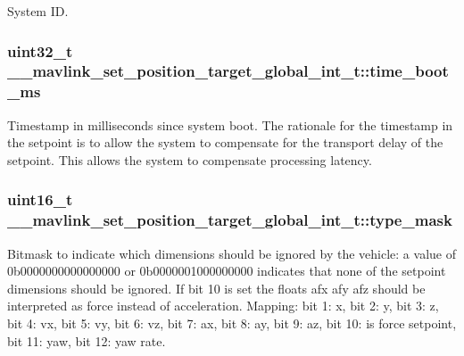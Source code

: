 System I\+D. 

\hypertarget{struct____mavlink__set__position__target__global__int__t_a06fb7be6c7bff5a263a0d795f5c8b8c1}{
\subsubsection[{time\+\_\+boot\+\_\+ms}]{\setlength{\rightskip}{0pt plus 5cm}uint32\+\_\+t \+\_\+\+\_\+mavlink\+\_\+set\+\_\+position\+\_\+target\+\_\+global\+\_\+int\+\_\+t\+::time\+\_\+boot\+\_\+ms}}\label{struct____mavlink__set__position__target__global__int__t_a06fb7be6c7bff5a263a0d795f5c8b8c1}


Timestamp in milliseconds since system boot. The rationale for the timestamp in the setpoint is to allow the system to compensate for the transport delay of the setpoint. This allows the system to compensate processing latency. 

\hypertarget{struct____mavlink__set__position__target__global__int__t_ad53f416128a22a21de85e3e68545f149}{
\subsubsection[{type\+\_\+mask}]{\setlength{\rightskip}{0pt plus 5cm}uint16\+\_\+t \+\_\+\+\_\+mavlink\+\_\+set\+\_\+position\+\_\+target\+\_\+global\+\_\+int\+\_\+t\+::type\+\_\+mask}}\label{struct____mavlink__set__position__target__global__int__t_ad53f416128a22a21de85e3e68545f149}


Bitmask to indicate which dimensions should be ignored by the vehicle\+: a value of 0b0000000000000000 or 0b0000001000000000 indicates that none of the setpoint dimensions should be ignored. If bit 10 is set the floats afx afy afz should be interpreted as force instead of acceleration. Mapping\+: bit 1\+: x, bit 2\+: y, bit 3\+: z, bit 4\+: vx, bit 5\+: vy, bit 6\+: vz, bit 7\+: ax, bit 8\+: ay, bit 9\+: az, bit 10\+: is force setpoint, bit 11\+: yaw, bit 12\+: yaw rate. 

